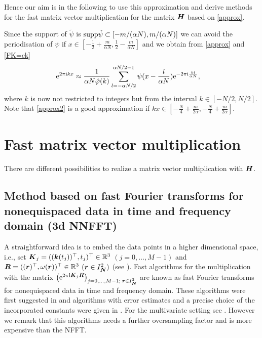\documentclass[journal]{IEEEtran}
\def\ti{\mbox{\scriptsize{\rm i}}}
\newcommand{\eip}[1]{{\rm e}^{ 2\pi{\ti} #1}}
\newcommand{\eim}[1]{{\rm e}^{-2\pi{\ti} #1}}
\newcommand{\zb}[1]{\mbox{\boldmath{${#1}$}}}
\newcommand{\zbs}[1]{\mbox{\boldmath\scriptsize{${#1}$}}}
\newcommand{\zbss}[1]{\mbox{\boldmath\tiny{${#1}$}}}
\numberwithin{equation}{section}
\numberwithin{table}{section}
\numberwithin{figure}{section}
\begin{document}
Hence our aim is in the following to use this approximation and derive
methods for the fast matrix vector multiplication for the matrix $\zb H$ based
on \eqref{approx}. 

Since the support of $\tilde\psi$ is ${\rm supp} \tilde\psi\subset
[-m/(\alpha N), m/(\alpha N)]$ we can avoid the periodisation of $\psi$ 
if $x\in[-\frac{1}{2}+\frac{m}{\alpha N},\frac{1}{2}-\frac{m}{\alpha N}]$ 
and we obtain from \eqref{approx} and \eqref{FK=ck}
\begin{equation} \label{approx2}
\eip{kx}
\approx
\frac{1}{\alpha N \hat\varphi(k)}
\sum_{l=-\alpha N/2}^{\alpha N/2-1} \psi (x-\frac{l}{\alpha N})
\eim{\frac{kl}{\alpha N}},\quad
\end{equation}
where $k$ is now not restricted to integers but from the interval
$k\in [-N/2,N/2]$.
Note that \eqref{approx2} is a good approximation if 
$kx\in[-\frac{N}{4}+\frac{m}{2\alpha},-\frac{N}{4}+\frac{m}{2\alpha}]$.


\section{Fast matrix vector multiplication}\label{Sec:H}
 
There are different possibilities to realize a matrix vector
multiplication with $\zb H$.

\subsection{Method based on fast Fourier transforms for
   nonequispaced data in time {\bf and} frequency domain (3d NNFFT)}
  
A straightforward idea is to embed the data points in a higher
   dimensional space, i.e., set $\zb K_j= ((\zb k(t_j))^{\top},
   t_j)^{\top}\in \mathbb{R}^3$ $(j=0,\ldots, M-1)$ and $\zb R= ((\zb
   r)^{\top}, 
   \omega(\zb r))^{\top}\in \mathbb{R}^3$ $(\zb r\in I_{\zbs N}^2)$ (see
   \cite[Example 2]{LeGr05}). Fast algorithms for the multiplication
   with the matrix $ 
  \left(\eip{\zbs K_j\zbs R}\right)_{j=0,\hdots,M-1;\;\zbs r\in 
  I_{\zbss N}^2}$ are known as fast Fourier transforms for
   nonequispaced data in time and frequency domain. These algorithms were
   first suggested in \cite{duro93} and algorithms with error
   estimates and a precise choice of the incorporated constants were
   given in \cite{ElSt}. For the multivariate setting see
   \cite{postta01}. However we remark that this algorithms needs a
   further oversampling factor and is more expensive than the NFFT.
\end{document}
